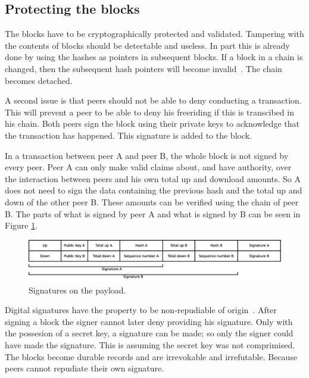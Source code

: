 \subsection{Protecting the blocks}
\label{sect:repudiation}
The blocks have to be cryptographically protected and validated.
Tampering with the contents of blocks should be detectable and useless.
In part this is already done by using the hashes as pointers in subsequent blocks.
If a block in a chain is changed, then the subsequent hash pointers will become invalid~\cite{VanderLubbe-crypto}.
The chain becomes detached.

A second issue is that peers should not be able to deny conducting a transaction.
This will prevent a peer to be able to deny his freeriding if this is transcibed in his chain.
Both peers sign the block using their private keys to acknowledge that the transaction has happened.
This signature is added to the block.

In a transaction between peer A and peer B, the whole block is not signed by every peer.
Peer A can only make valid claims about, and have authority, over the interaction between peers
and his own total up and download amounts.
So A does not need to sign the data containing the previous hash and the total up and down of the other peer B.
These amounts can be verified using the chain of peer B.
The parts of what is signed by peer A and what is signed by B can be seen in Figure \ref{fig:signatures}.
\begin{figure}
	\centerline{\includegraphics[scale=0.3]{design/figs/signatures.eps}}
	\caption{Signatures on the payload.}
	\label{fig:signatures}
\end{figure}

Digital signatures have the property to be non-repudiable of origin~\cite{VanderLubbe-crypto}.
After signing a block the signer cannot later deny providing his signature.
Only with the possesion of a secret key,
a signature can be made;
so only the signer could have made the signature.
This is assuming the secret key was not comprimised.
The blocks become durable records and are irrevokable and irrefutable.
Because peers cannot repudiate their own signature.

